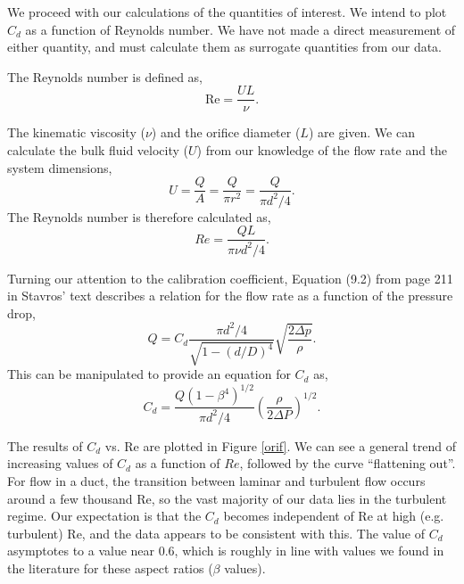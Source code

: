 \documentclass{article}
\begin{document}
We proceed with our calculations of the quantities of interest. We
intend to plot $C_d$ as a function of Reynolds number. We have not made
a direct measurement of either quantity, and must calculate them as
surrogate quantities from our data. 

The Reynolds number is defined as, 
\begin{equation}
 \text{Re} = \frac{UL}{\nu}.
\end{equation}

The kinematic viscosity ($\nu$) and the orifice diameter ($L$) are
given. We can calculate the bulk fluid velocity ($U$) from our knowledge
of the flow rate and the system dimensions, 
\begin{equation}
 U = \frac{Q}{A} = \frac{Q}{\pi r^2} = \frac{Q}{\pi d^2/4}.
\end{equation}
The Reynolds number is therefore calculated as,
\begin{equation}
 Re = \frac{Q L}{\pi \nu d^2/4}.
\end{equation}

Turning our attention to the calibration coefficient, Equation (9.2)
from page 211 in Stavros' text describes a relation for  
the flow rate as a function of the pressure drop,  
\begin{equation*}
 Q = C_d \frac{\pi d^2 / 4}{\sqrt{1-(d/D)^4}}\sqrt{\frac{2 \Delta p}{\rho}}.
\end{equation*}
This can be manipulated to provide an equation for $C_d$ as, 
\begin{equation}
 C_d = \frac{Q (1-\beta^4)^{1/2}}{\pi d^2/4} \left(\frac{\rho}{2 \Delta
					      P}\right)^{1/2}.
\end{equation}

The results of $C_d$ vs. Re are plotted in Figure \ref{orif}. We can see a general trend of increasing 
values of $C_d$ as a function of $Re$, followed by the curve ``flattening out''. For flow in a duct, 
the transition between laminar and turbulent flow occurs around a few thousand Re, so the vast majority 
of our data lies in the turbulent regime. Our expectation is that the $C_d$ becomes independent of Re at high 
(e.g. turbulent) Re, and the data appears to be consistent with this. The value of $C_d$ asymptotes to a value near 0.6, which is roughly in line with values we found in the literature for these aspect ratios ($\beta$ values).
\end{document}
